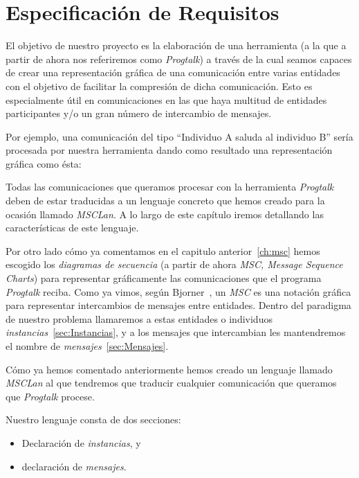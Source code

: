 \chapter{Especificación de Requisitos}
\label{ch:requisitos}

El objetivo de nuestro proyecto es la elaboración de una herramienta
(a la que a partir de ahora nos referiremos como \textit{Progtalk}) a
través de la cual seamos capaces de crear una representación gráfica
de una comunicación entre varias entidades con el objetivo de
facilitar la compresión de dicha comunicación. Esto es especialmente
útil en comunicaciones en las que haya multitud de entidades
participantes y/o un gran número de intercambio de mensajes.

Por ejemplo, una comunicación del tipo ``Individuo A saluda al
individuo B'' sería procesada por nuestra herramienta dando como
resultado una representación gráfica como ésta:


Todas las comunicaciones que queramos procesar con la herramienta
\textit{Progtalk} deben de estar traducidas a un lenguaje concreto que
hemos creado para la ocasión llamado \textit{MSCLan}. A lo largo de
este capítulo iremos detallando las características de este lenguaje.

Por otro lado cómo ya comentamos en el capitulo anterior~\ref{ch:msc}
hemos escogido los \textit{diagramas de secuencia} (a partir de ahora
\textit{MSC, Message Sequence Charts}) para representar gráficamente
las comunicaciones que el programa \textit{Progtalk} reciba. Como ya
vimos, según Bjorner~\cite{bjorner}, un \textit{MSC} es una notación
gráfica para representar intercambios de mensajes entre
entidades. Dentro del paradigma de nuestro problema llamaremos a estas
entidades o individuos \textit{instancias}~\ref{sec:Instancias}, y a
los mensajes que intercambian les mantendremos el nombre de
\textit{mensajes}~\ref{sec:Mensajes}. 

Cómo ya hemos comentado anteriormente hemos creado un lenguaje llamado
\textit{MSCLan} al que tendremos que traducir cualquier comunicación
que queramos que \textit{Progtalk} procese.

Nuestro lenguaje consta de dos secciones:
\begin{itemize}
\item Declaración de \textit{instancias}, y
\item declaración de \textit{mensajes}.
\end{itemize}

